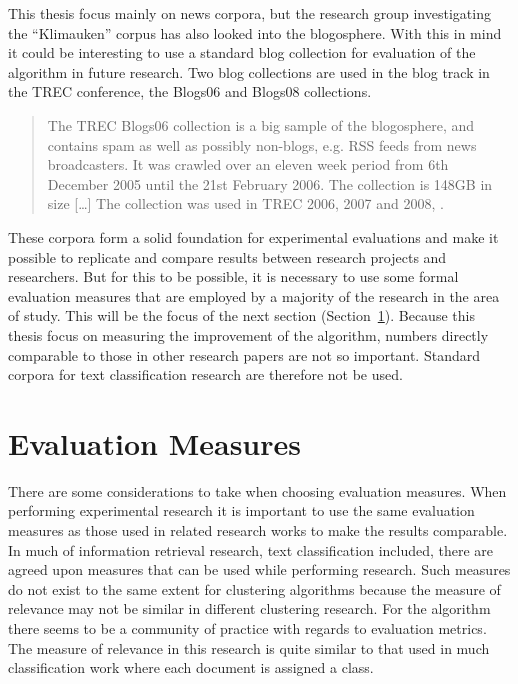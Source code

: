 This thesis focus mainly on news corpora, but the research group investigating the ``Klimauken'' corpus has also looked into the blogosphere. With this in mind it could be interesting to use a standard blog collection for evaluation of the algorithm in future research. Two blog collections are used in the blog track in the TREC conference, the Blogs06 and Blogs08 collections.\begin{quote}
The TREC Blogs06 collection is a big sample of the blogosphere, and contains spam as well as possibly non-blogs, e.g. RSS feeds from news broadcasters. It was crawled over an eleven week period from 6th December 2005 until the 21st February 2006. The collection is 148GB in size [\dots] The collection was used in TREC 2006, 2007 and 2008, \parencite{Macdonald2011}.
\end{quote} 

These corpora form a solid foundation for experimental evaluations and make it possible to replicate and compare results between research projects and researchers. But for this to be possible, it is necessary to use some formal evaluation measures that are employed by a majority of the research in the area of study. This will be the focus of the next section (Section~\ref{EvaluationMeasures}). Because this thesis focus on measuring the improvement of the algorithm, numbers directly comparable to those in other research papers are not so important. Standard corpora for text classification research are therefore not be used.

\section{Evaluation Measures}
\label{EvaluationMeasures}
There are some considerations to take when choosing evaluation measures. When performing experimental research it is important to use the same evaluation measures as those used in related research works to make the results comparable. In much of information retrieval research, text classification included, there are agreed upon measures that can be used while performing research. Such measures do not exist to the same extent for clustering algorithms because the measure of relevance may not be similar in different clustering research. For the \STC algorithm there seems to be a community of practice with regards to evaluation metrics. The measure of relevance in this research is quite similar to that used in much classification work where each document is assigned a class.

